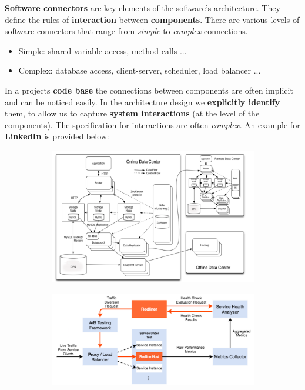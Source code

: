 \documentclass[a4paper]{article}
\begin{document}
\textbf{Software connectors} are key elements of the software's architecture. They define the rules of \textbf{interaction} between \textbf{components}. There are various levels of software connectors that range from \textit{simple} to \textit{complex} connections.
\begin{itemize}
\item Simple: shared variable access, method calls ...
\item Complex: database access, client-server, scheduler, load balancer ...\\
\end{itemize}

In a projects \textbf{code base} the connections between components are often implicit and can be noticed easily. In the architecture design we \textbf{explicitly identify} them, to allow us to capture \textbf{system interactions} (at the level of the components). The specification for interactions are often \textit{complex.} An example for \textbf{LinkedIn} is provided below:\\

\begin{figure}[H]
\centering
\hskip-2.5cm\begin{subfigure}{1\textwidth}
  \includegraphics[width=1\linewidth]
  {images/10-linked.png}
\end{subfigure}
\end{figure}

\begin{figure}[H]
\centering
\hskip-2.5cm\begin{subfigure}{1\textwidth}
  \includegraphics[width=1\linewidth]
  {images/10-linked-redliner.png}
\end{subfigure}
\end{figure}
\end{document}
